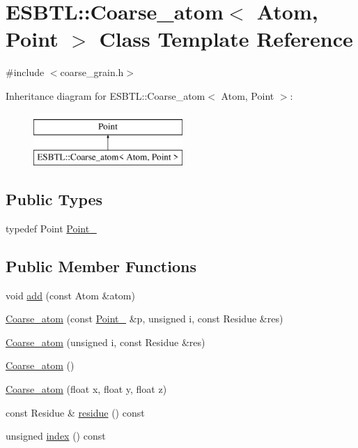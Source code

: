 \hypertarget{classESBTL_1_1Coarse__atom}{}\section{E\+S\+B\+TL\+:\+:Coarse\+\_\+atom$<$ Atom, Point $>$ Class Template Reference}
\label{classESBTL_1_1Coarse__atom}


{\ttfamily \#include $<$coarse\+\_\+grain.\+h$>$}

Inheritance diagram for E\+S\+B\+TL\+:\+:Coarse\+\_\+atom$<$ Atom, Point $>$\+:\begin{figure}[H]
\begin{center}
\leavevmode
\includegraphics[height=2.000000cm]{classESBTL_1_1Coarse__atom}
\end{center}
\end{figure}
\subsection*{Public Types}
\begin{DoxyCompactItemize}
\item 
typedef Point \hyperlink{classESBTL_1_1Coarse__atom_acfe6c03e22cc26daef4776e7ca8a7db6}{Point\+\_}
\end{DoxyCompactItemize}
\subsection*{Public Member Functions}
\begin{DoxyCompactItemize}
\item 
void \hyperlink{classESBTL_1_1Coarse__atom_a4cd2e08c968eac9e00493e4d43e24557}{add} (const Atom \&atom)
\item 
\hyperlink{classESBTL_1_1Coarse__atom_ae1eb9078c6062f775c1390272c6764a9}{Coarse\+\_\+atom} (const \hyperlink{classESBTL_1_1Coarse__atom_acfe6c03e22cc26daef4776e7ca8a7db6}{Point\+\_} \&p, unsigned i, const Residue \&res)
\item 
\hyperlink{classESBTL_1_1Coarse__atom_a799d08aa0f138973750012a43f6428b9}{Coarse\+\_\+atom} (unsigned i, const Residue \&res)
\item 
\hyperlink{classESBTL_1_1Coarse__atom_a91362ec8871caea4dcc7b0822bd4be9c}{Coarse\+\_\+atom} ()
\item 
\hyperlink{classESBTL_1_1Coarse__atom_a127c90585bdd67131ff4159662bbd917}{Coarse\+\_\+atom} (float x, float y, float z)
\item 
const Residue \& \hyperlink{classESBTL_1_1Coarse__atom_ab07cf33f1040349d5af862f147dbc022}{residue} () const
\item 
unsigned \hyperlink{classESBTL_1_1Coarse__atom_adf0d8955c898d77d6040dec96be9fed1}{index} () const
\end{DoxyCompactItemize}


